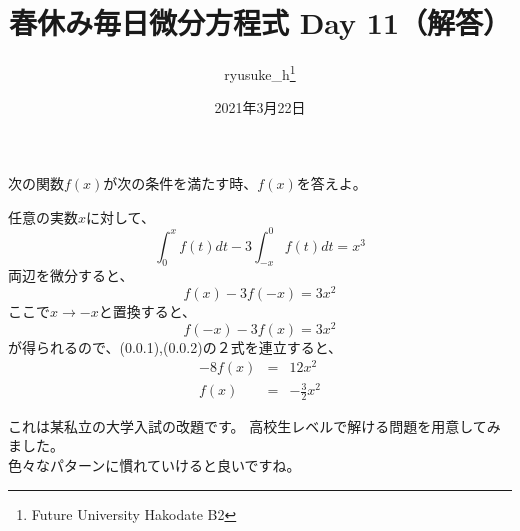 \documentclass[a4j]{jsarticle}
\title{春休み毎日微分方程式 Day 11（解答）}
\author{ryusuke\_h\thanks{Future University Hakodate B2}}
\date{2021年3月22日}
\begin{document}
\begin{spacing}{1.6}
\maketitle

次の関数$f(x)$が次の条件を満たす時、$f(x)$を答えよ。\\
\begin{qparts}
  \qpart 任意の実数$x$に対して、
  \begin{equation*}
    \int_0^x f(t)dt - 3\int_{-x}^0 f(t)dt = x^3
  \end{equation*}
  両辺を微分すると、
  \begin{equation}
    f(x) - 3f(-x) = 3x^2
  \end{equation}
  ここで$x \rightarrow -x$と置換すると、
  \begin{equation}
    f(-x) - 3f(x) = 3x^2
  \end{equation}
  が得られるので、(0.0.1),(0.0.2)の２式を連立すると、
  \begin{eqnarray*}
    -8f(x) & = & 12x^2 \\
    f(x) & = & - \frac{3}{2}x^2
  \end{eqnarray*}
  \end{qparts}
  \end{spacing}
  \begin{shadebox}
    これは某私立の大学入試の改題です。 
    高校生レベルで解ける問題を用意してみました。 \\
    色々なパターンに慣れていけると良いですね。
  \end{shadebox}
\end{document}
